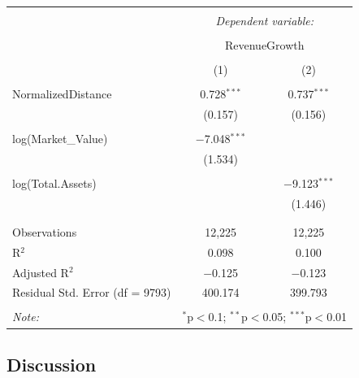 \documentclass[
]{article}
\begin{document}
\begin{table}[!htbp] \centering 
  \caption{} 
  \label{} 
\begin{tabular}{@{\extracolsep{5pt}}lcc} 
\\[-1.8ex]\hline 
\hline \\[-1.8ex] 
 & \multicolumn{2}{c}{\textit{Dependent variable:}} \\ 
\cline{2-3} 
\\[-1.8ex] & \multicolumn{2}{c}{RevenueGrowth} \\ 
\\[-1.8ex] & (1) & (2)\\ 
\hline \\[-1.8ex] 
 NormalizedDistance & 0.728$^{***}$ & 0.737$^{***}$ \\ 
  & (0.157) & (0.156) \\ 
  & & \\ 
 log(Market\_Value) & $-$7.048$^{***}$ &  \\ 
  & (1.534) &  \\ 
  & & \\ 
 log(Total.Assets) &  & $-$9.123$^{***}$ \\ 
  &  & (1.446) \\ 
  & & \\ 
\hline \\[-1.8ex] 
Observations & 12,225 & 12,225 \\ 
R$^{2}$ & 0.098 & 0.100 \\ 
Adjusted R$^{2}$ & $-$0.125 & $-$0.123 \\ 
Residual Std. Error (df = 9793) & 400.174 & 399.793 \\ 
\hline 
\hline \\[-1.8ex] 
\textit{Note:}  & \multicolumn{2}{r}{$^{*}$p$<$0.1; $^{**}$p$<$0.05; $^{***}$p$<$0.01} \\ 
\end{tabular} 
\end{table}

\subsection{Discussion}\label{discussion}
\end{document}
